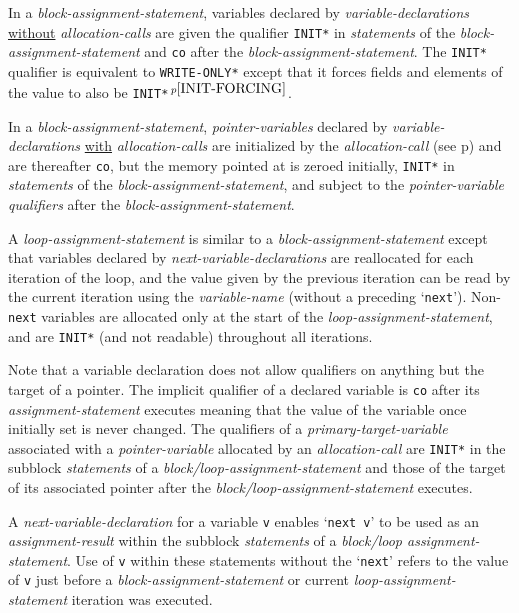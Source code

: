 \documentclass[12pt]{article}
\newcommand{\pagref}[1]{p\pageref{#1}}
\newcommand{\pagnote}[1]{$\,^{p\pageref{#1}}$}
\newcommand{\EOL}{\penalty \exhyphenpenalty}
\begin{document}
In a {\em block-assignment-statement},
variables declared by {\em variable-declarations}
\underline{without} {\em alloca\-tion-calls}
are given the qualifier {\tt *INIT*} in {\em statements}
of the {\em block-assignment-statement} and {\tt co} after the
{\em block-assignment-statement}.
The {\tt *INIT*} qualifier is equivalent to {\tt *WRITE-\EOL ONLY*}
except that it forces fields and elements of the value to also
be {\tt *INIT*}\pagnote{INIT-FORCING}.

In a {\em block-assignment-statement},
{\em pointer-variables} declared by {\em variable-declarations}
\underline{with} {\em allocation-calls}
are initialized by the {\em allocation-call}
(see \pagref{ALLOCATION-CALLS}) and are thereafter
{\tt co}, but the memory
pointed at is zeroed initially,
{\tt *INIT*} in {\em statements}
of the {\em block-assignment-statement}, and
subject to the {\em pointer-variable} {\em qualifiers} after
the {\em block-assignment-statement}.

A {\em loop-assignment-statement} is similar to a
{\em block-assignment-statement} except that variables declared
by {\em next-variable-declarations} are reallocated for each iteration
of the loop, and the value given by the previous iteration can be
read by the current iteration using the {\em variable-name}
(without a preceding `{\tt next}').
Non-{\tt next} variables are allocated only at the start of the
{\em loop-assignment-statement}, and are {\tt *INIT*} (and not readable)
throughout all iterations.

Note that a variable declaration does not allow
qualifiers on anything but the target of a pointer.  The implicit
qualifier of a declared variable is {\tt co} after its
{\em assignment-statement} executes meaning that
the value of the variable once initially set is never changed.
The qualifiers of a {\em primary-target-variable} associated with a
{\em pointer-variable} allocated by an {\em allocation-call}
are {\tt *INIT*} in the subblock {\em statements}
of a {\em block/loop-assignment-statement} and those of the target of
its associated pointer after the
{\em block/loop-assignment-statement} executes.

A {\em next-variable-declaration} for a variable {\tt v} enables
`{\tt next v}' to be used as an {\em assignment-result} within the subblock
{\em statements} of a {\em block/loop assignment-statement}.  Use of
{\tt v} within these statements without the `{\tt next}'
refers to the value of {\tt v} just
before a {\em block-assignment-statement} or current
{\em loop-assignment-statement} iteration was executed.
\end{document}
